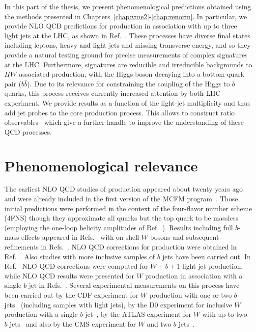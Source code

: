 
In this part of the thesis, we present phenomenological
predictions obtained using the methods presented in
Chapters~\ref{chap:vme2}-\ref{chap:renorm}. In particular, we provide NLO QCD predictions for \Wbb{} production in association with up to three light
jets at the LHC, as shown in
Ref.~\cite{wbbpaper}. These processes have diverse final states including leptons, heavy and light jets and missing
transverse energy, and so they provide a natural testing ground for precise measurements of complex signatures at the LHC.
Furthermore, \Wbb{} signatures are reducible and irreducible backgrounds to $HW$ associated
production, with the Higgs boson decaying into a bottom-quark pair ($b\bar b$). Due to its relevance for constraining the coupling of the Higgs to $b$ quarks, this process
receives currently increased attention by both LHC experiment.
%
We provide results as a function of the light-jet multiplicity and thus add jet probes to the core
production process. This allows to construct ratio observables~\cite{JetRatios1,JetRatios2,JetRatios3,JetRatios4,BH:Wratios} which give a further handle to improve the understanding of these QCD processes. 


\section{Phenomenological relevance}

The earliest NLO QCD studies of \Wbb{}
production appeared about twenty years ago~\cite{Ellis:1998fv} and were already included in the first version
of the MCFM program~\cite{mcfm7}. Those initial predictions were performed in the context of the four-flavor number
scheme (4FNS) though they approximate all quarks but the top quark to be massless (employing the one-loop helicity amplitudes of Ref.~\cite{Bern:1997sc}).
Results including full $b$-mass effects appeared in
Refs.~\cite{FebresCordero:2006sj,Cordero:2009kv} with on-shell $W$ bosons and
subsequent refinements in Refs.~\cite{Badger:2010mg,Oleari:2011ey}. NLO QCD
corrections for \Wbbnj[1]{} production were obtained
in Ref.~\cite{Luisoni:2015mpa}.  Also studies with
more inclusive samples of $b$ jets have been carried out. In
Ref.~\cite{Campbell:2006cu} NLO QCD corrections were computed for $W+b+1$-light
jet production, while NLO QCD results were presented for $W$ production in
association with a single $b$ jet in Refs.~\cite{Campbell:2008hh,Caola:2011pz}. Several experimental measurements on this process have been carried out by the CDF experiment for $W$
production with one or two $b$ jets~\cite{Aaltonen:2009qi} (including samples
with light jets), by the D0 experiment for inclusive $W$ production with a single $b$
jet~\cite{D0:2012qt}, by the ATLAS experiment for $W$ with up to two $b$
jets~\cite{Aad:2013vka} and also by the CMS experiment for $W$ and two $b$
jets~\cite{Chatrchyan:2013uza,CMS:2016bb}.

